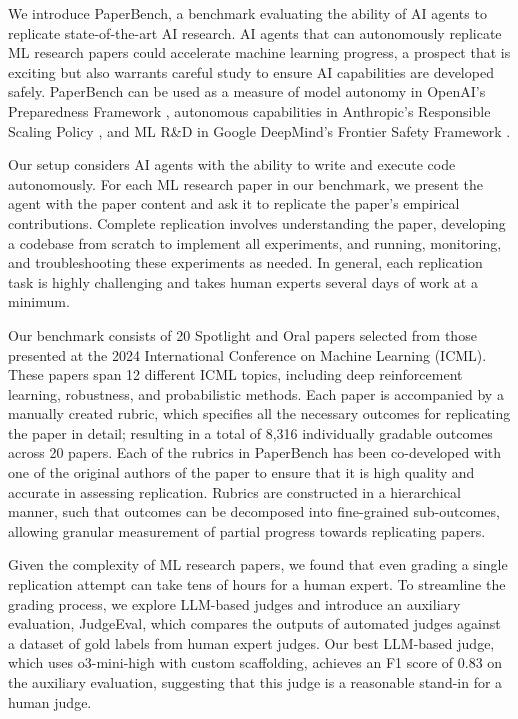 \documentclass{article}
\theoremstyle{plain}
\theoremstyle{definition}
\theoremstyle{remark}
\begin{document}
We introduce PaperBench, a benchmark evaluating the ability of AI agents to replicate state-of-the-art AI research. AI agents that can autonomously replicate ML research papers could accelerate machine learning progress, a prospect that is exciting but also warrants careful study to ensure AI capabilities are developed safely. PaperBench can be used as a measure of model autonomy in OpenAI’s Preparedness Framework \citep{openai_preparedness_2023}, autonomous capabilities in Anthropic’s Responsible Scaling Policy \citep{anthropic_rsp}, and ML R\&D in Google DeepMind’s Frontier Safety Framework \citep{google_deepmind_frontier_2024}.

Our setup considers AI agents with the ability to write and execute code autonomously. For each ML research paper in our benchmark, we present the agent with the paper content and ask it to replicate the paper’s empirical contributions. Complete replication involves understanding the paper, developing a codebase from scratch to implement all experiments, and running, monitoring, and troubleshooting these experiments as needed. In general, each replication task is highly challenging and takes human experts several days of work at a minimum.

Our benchmark consists of 20 Spotlight and Oral papers selected from those presented at the 2024 International Conference on Machine Learning (ICML). These papers span 12 different ICML topics, including deep reinforcement learning, robustness, and probabilistic methods. Each paper is accompanied by a manually created rubric, which specifies all the necessary outcomes for replicating the paper in detail; resulting in a total of 8,316 individually gradable outcomes across 20 papers. Each of the rubrics in PaperBench has been co-developed with one of the original authors of the paper to ensure that it is high quality and accurate in assessing replication. Rubrics are constructed in a hierarchical manner, such that outcomes can be decomposed into fine-grained sub-outcomes, allowing granular measurement of partial progress towards replicating papers.

Given the complexity of ML research papers, we found that even grading a single replication attempt can take tens of hours for a human expert. To streamline the grading process, we explore LLM-based judges and introduce an auxiliary evaluation, JudgeEval, which compares the outputs of automated judges against a dataset of gold labels from human expert judges. Our best LLM-based judge, which uses o3-mini-high with custom scaffolding, achieves an F1 score of 0.83 on the auxiliary evaluation, suggesting that this judge is a reasonable stand-in for a human judge.
\end{document}
